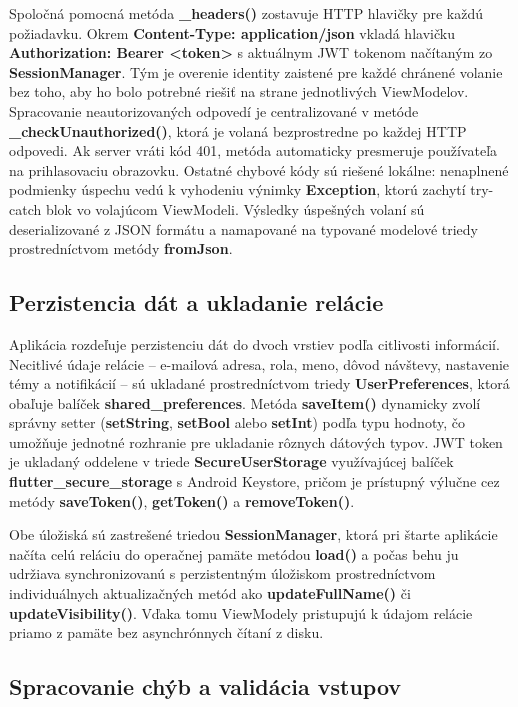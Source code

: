 Spoločná pomocná metóda \textbf{\_headers()} zostavuje HTTP hlavičky pre každú požiadavku. Okrem \textbf{Content-Type: application/json} vkladá hlavičku \textbf{Authorization: Bea\-rer <token>} s aktuálnym JWT tokenom načítaným zo \textbf{SessionManager}. Tým je overenie identity zaistené pre každé chránené volanie bez toho, aby ho bolo potrebné riešiť na strane jednotlivých ViewModelov. Spracovanie neautorizovaných odpovedí je centralizované v metóde \textbf{\_checkUnauthorized()}, ktorá je volaná bezprostredne po každej HTTP odpovedi. Ak server vráti kód 401, metóda automaticky presmeruje používateľa na prihlasovaciu obrazovku. Ostatné chybové kódy sú riešené lokálne: nenaplnené podmienky úspechu vedú k vyhodeniu výnimky \textbf{Exception}, ktorú zachytí try-catch blok vo volajúcom ViewModeli. Výsledky úspešných volaní sú deserializované z JSON formátu a namapované na typované modelové triedy prostredníctvom metódy \textbf{fromJson}.

\subsection{Perzistencia dát a ukladanie relácie}
\label{subsec:impl-secure}
Aplikácia rozdeľuje perzistenciu dát do dvoch vrstiev podľa citlivosti informácií. Necitlivé údaje relácie – e-mailová adresa, rola, meno, dôvod návštevy, nastavenie témy a notifikácií – sú ukladané prostredníctvom triedy \textbf{UserPreferences}, ktorá obaľuje balíček \textbf{shared\_preferences}. Metóda \textbf{saveItem()} dynamicky zvolí správny setter (\textbf{setString}, \textbf{setBool} alebo \textbf{setInt}) podľa typu hodnoty, čo umožňuje jednotné rozhranie pre ukladanie rôznych dátových typov. JWT token je ukladaný oddelene v triede \textbf{SecureUserStorage} využívajúcej balíček \textbf{flutter\_secure\_storage} s Android Keystore, pričom je prístupný výlučne cez metódy \textbf{saveToken()}, \textbf{getToken()} a \textbf{removeToken()}.

Obe úložiská sú zastrešené triedou \textbf{SessionManager}, ktorá pri štarte aplikácie načíta celú reláciu do operačnej pamäte metódou \textbf{load()} a počas behu ju udržiava synchronizovanú s perzistentným úložiskom prostredníctvom individuálnych aktualizačných metód ako \textbf{updateFullName()} či \textbf{updateVisibility()}. Vďaka tomu ViewModely pristupujú k údajom relácie priamo z pamäte bez asynchrónnych čítaní z disku.

\subsection{Spracovanie chýb a validácia vstupov}

